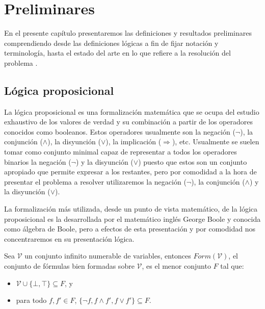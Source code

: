 \chapter{Preliminares}
\label{preliminares}

En el presente capítulo presentaremos las definiciones y resultados preliminares comprendiendo desde las definiciones lógicas a fin de fijar notación y terminología, hasta el estado del arte en lo que refiere a la resolución del problema \sat .

\section{Lógica proposicional}
La lógica proposicional es una formalización matemática que se ocupa del estudio exhaustivo de los valores de verdad y su combinación a partir de los operadores conocidos como booleanos. Estos operadores usualmente son la negación ($\neg$), la conjunción ($\land$), la disyunción ($\lor$), la implicación ($\Rightarrow$), etc. Usualmente se suelen tomar como conjunto minimal capaz de representar a todos los operadores binarios la negación ($\neg$) y la disyunción ($\lor$) puesto que estos son un conjunto apropiado que permite expresar a los restantes, pero por comodidad a la hora de presentar el problema a resolver utilizaremos la negación ($\neg$), la conjunción ($\land$) y la disyunción ($\lor$).

La formalización más utilizada, desde un punto de vista matemático, de la lógica proposicional es la desarrollada por el matemático inglés George Boole \cite{boole1847} y conocida como álgebra de Boole, pero a efectos de esta presentación y por comodidad nos concentraremos en su presentación lógica.

\begin{definition}
Sea $\mathcal{V}$ un conjunto infinito numerable de variables, entonces $\mathit{Form} (\mathcal{V})$, el conjunto de fórmulas bien formadas sobre $\mathcal{V}$, es el menor conjunto $F$ tal que:
\begin{itemize}
\item $\mathcal{V}\cup\{\bot, \top\} \subseteq F$, y 
\item para todo $f, f' \in F$, $\{\neg f, f \land f', f \lor f'\} \subseteq F$.
\end{itemize}
\end{definition}

